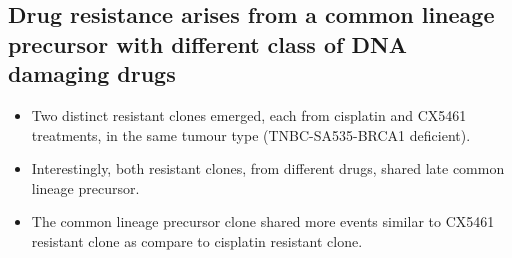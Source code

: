  \subsection{Drug resistance arises from a common lineage precursor with different class of DNA damaging drugs}
\begin{itemize} 
  \item  Two distinct resistant clones emerged, each from cisplatin and CX5461 treatments, in the same tumour type (TNBC-SA535-BRCA1 deficient).
 
  \item Interestingly, both resistant clones, from different drugs, shared late common lineage precursor.
  
  \item The common lineage precursor clone shared more events similar to CX5461 resistant clone as compare to cisplatin resistant clone. 
   


\end{itemize}






